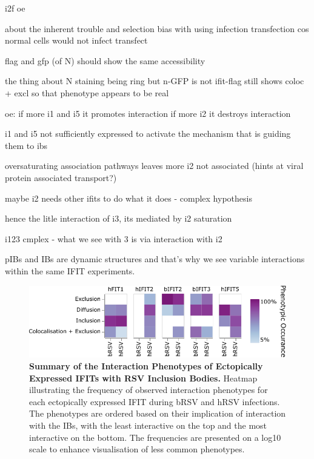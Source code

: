 i2f oe

about the inherent trouble and selection bias with using infection transfection cos normal cells would not infect transfect

flag and gfp (of N) should show the same accessibility

the thing about N staining being ring but n-GFP is not
ifit-flag still shows coloc + excl so that phenotype appears to be real

oe:
if more i1 and i5 it promotes interaction
if more i2 it destroys interaction


i1 and i5 not sufficiently expressed to activate the mechanism that is guiding them to ibs

oversaturating association pathways leaves more i2 not associated (hints at viral protein associated transport?)

maybe i2 needs other ifits to do what it does - complex hypothesis

hence the litle interaction of i3, its mediated by i2 saturation

i123 cmplex - what we see with 3 is via interaction with i2

pIBs and IBs are dynamic structures and that's why we see variable interactions within the same IFIT experiments.

\begin{figure}
    \centering
    \includegraphics[width=1\linewidth]{09. Chapter 4/Figs/heatmap-infection-transfection.pdf}
    \caption[Summary of the Interaction Phenotypes of Ectopically Expressed IFITs with RSV Inclusion Bodies.]{\textbf{Summary of the Interaction Phenotypes of Ectopically Expressed IFITs with RSV Inclusion Bodies.} Heatmap illustrating the frequency of observed interaction phenotypes for each ectopically expressed IFIT during bRSV and hRSV infections. The phenotypes are ordered based on their implication of interaction with the IBs, with the least interactive on the top and the most interactive on the bottom. The frequencies are presented on a log10 scale to enhance visualisation of less common phenotypes.}
    \label{fig:Summary of the Interaction Phenotypes of Ectopically Expressed IFITs with RSV Inclusion Bodies}
\end{figure}


